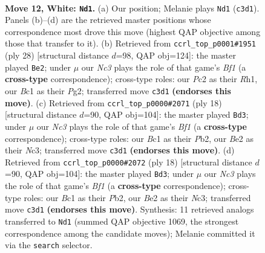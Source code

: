 \documentclass[11pt]{article}
\begin{document}
\clearpage

\begin{figure}[p]\centering
\begin{subfigure}{0.46\textwidth}\centering
\resizebox{\linewidth}{!}{%
\newchessgame
\chessboard[
  setfen={rn2kbnr/p3qpp1/2p5/1p1p2Pp/3P4/2N2Q1P/PPP1BP2/R1B2RK1 w kq - 0 12},
  showmover=false,
  pgfstyle=straightmove, color=movearrow, markmove={c3-d1}
]}
\caption{}
\end{subfigure}\hfill
\begin{subfigure}{0.46\textwidth}\centering
\resizebox{\linewidth}{!}{%
\newchessgame
\chessboard[
  setfen={r3kb1r/pb3pq1/n1p1p2p/1p6/2p1PQ1P/2N3B1/PP3PP1/3RKB1R w Kkq - 4 15},
  showmover=false,
  pgfstyle=straightmove, color=movearrow, markmove={f1-e2}
]}
\caption{}
\end{subfigure}
\\[4pt]
\begin{subfigure}{0.46\textwidth}\centering
\resizebox{\linewidth}{!}{%
\newchessgame
\chessboard[
  setfen={r3kbnr/1bqp1ppp/p3p3/1p6/3QPP2/2N1B3/PPP3PP/2KR1B1R w kq - 2 10},
  showmover=false,
  pgfstyle=straightmove, color=movearrow, markmove={f1-d3}
]}
\caption{}
\end{subfigure}\hfill
\begin{subfigure}{0.46\textwidth}\centering
\resizebox{\linewidth}{!}{%
\newchessgame
\chessboard[
  setfen={r3kbnr/1bqp1ppp/p3p3/1p6/3QPP2/2N1B3/PPP3PP/2KR1B1R w kq - 2 10},
  showmover=false,
  pgfstyle=straightmove, color=movearrow, markmove={f1-d3}
]}
\caption{}
\end{subfigure}
\caption{\textbf{Move 12, White: \texttt{Nd1}.} (a) Our position; Melanie plays \texttt{Nd1} (\texttt{c3d1}). Panels (b)--(d) are the retrieved master positions whose correspondence most drove this move (highest QAP objective among those that transfer to it). (b) Retrieved from \texttt{ccrl\_top\_p0001\#1951} (ply 28) [structural distance $d$=98, QAP obj=124]: the master played \texttt{Be2}; under $\mu$ our \emph{Nc3} plays the role of that game's \emph{Bf1} (a \textbf{cross-type} correspondence); cross-type roles: our \emph{P}c2 as their \emph{R}h1, our \emph{B}c1 as their \emph{P}g2; transferred move \texttt{c3d1} \textbf{(endorses this move)}. (c) Retrieved from \texttt{ccrl\_top\_p0000\#2071} (ply 18) [structural distance $d$=90, QAP obj=104]: the master played \texttt{Bd3}; under $\mu$ our \emph{Nc3} plays the role of that game's \emph{Bf1} (a \textbf{cross-type} correspondence); cross-type roles: our \emph{B}c1 as their \emph{P}b2, our \emph{B}e2 as their \emph{N}c3; transferred move \texttt{c3d1} \textbf{(endorses this move)}. (d) Retrieved from \texttt{ccrl\_top\_p0000\#2072} (ply 18) [structural distance $d$=90, QAP obj=104]: the master played \texttt{Bd3}; under $\mu$ our \emph{Nc3} plays the role of that game's \emph{Bf1} (a \textbf{cross-type} correspondence); cross-type roles: our \emph{B}c1 as their \emph{P}b2, our \emph{B}e2 as their \emph{N}c3; transferred move \texttt{c3d1} \textbf{(endorses this move)}. Synthesis: 11 retrieved analogs transferred to \texttt{Nd1} (summed QAP objective 1069, the strongest correspondence among the candidate moves); Melanie committed it via the \texttt{search} selector.}
\label{fig:thought-m22}
\end{figure}
\end{document}
